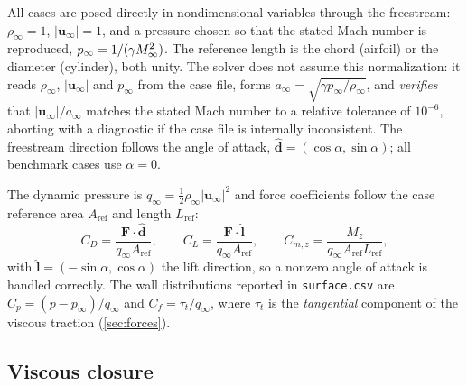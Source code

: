 All cases are posed directly in nondimensional variables through the
freestream: $\rho_\infty=1$, $|\mathbf{u}_\infty|=1$, and a pressure chosen so
that the stated Mach number is reproduced, $p_\infty=1/(\gamma M_\infty^2)$. The
reference length is the chord (airfoil) or the diameter (cylinder), both unity.
The solver does not assume this normalization: it reads $\rho_\infty$,
$|\mathbf{u}_\infty|$ and $p_\infty$ from the case file, forms
$a_\infty=\sqrt{\gamma p_\infty/\rho_\infty}$, and \emph{verifies} that
$|\mathbf{u}_\infty|/a_\infty$ matches the stated Mach number to a relative
tolerance of $10^{-6}$, aborting with a diagnostic if the case file is
internally inconsistent. The freestream direction follows the angle of attack,
$\hat{\mathbf{d}}=(\cos\alpha,\sin\alpha)$; all benchmark cases use
$\alpha=0$.

The dynamic pressure is $q_\infty=\tfrac12\rho_\infty|\mathbf{u}_\infty|^2$
and force coefficients follow the case reference area $A_{\text{ref}}$ and
length $L_{\text{ref}}$:
\begin{equation}
  C_D=\frac{\mathbf{F}\cdot\hat{\mathbf{d}}}{q_\infty A_{\text{ref}}},\qquad
  C_L=\frac{\mathbf{F}\cdot\hat{\mathbf{l}}}{q_\infty A_{\text{ref}}},\qquad
  C_{m,z}=\frac{M_z}{q_\infty A_{\text{ref}} L_{\text{ref}}},
  \label{eq:coeffs}
\end{equation}
with $\hat{\mathbf{l}}=(-\sin\alpha,\cos\alpha)$ the lift direction, so a
nonzero angle of attack is handled correctly. The wall distributions reported
in \texttt{surface.csv} are $C_p=(p-p_\infty)/q_\infty$ and
$C_f=\tau_t/q_\infty$, where $\tau_t$ is the \emph{tangential} component of the
viscous traction (\cref{sec:forces}).

\subsection{Viscous closure}

